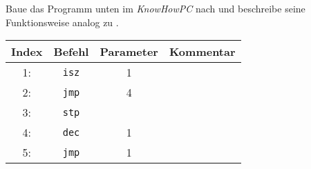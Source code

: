 \documentclass[10pt, a4paper]{scrartcl}
\begin{document}
\begin{aufgabe}[symbol=\symLaptop]
	Baue das Programm unten im \emph{KnowHowPC} nach und beschreibe seine Funktionsweise analog zu .
	
	\begin{center}
	\begin{tabularx}{.8\textwidth}{|c|c|c|X|}\hline
		\rowcolor{black!10}
		Index & Befehl & Parameter & Kommentar \\\hline
		1: & \texttt{isz} & 1 & \Zeilenabstand\\\hline
		2: & \texttt{jmp} & 4 & \Zeilenabstand\\\hline
		3: & \texttt{stp} &   & \Zeilenabstand\\\hline
		4: & \texttt{dec} & 1 & \Zeilenabstand\\\hline
		5: & \texttt{jmp} & 1 & \Zeilenabstand\\\hline
	\end{tabularx}
	\end{center}
\end{aufgabe}
\end{document}
